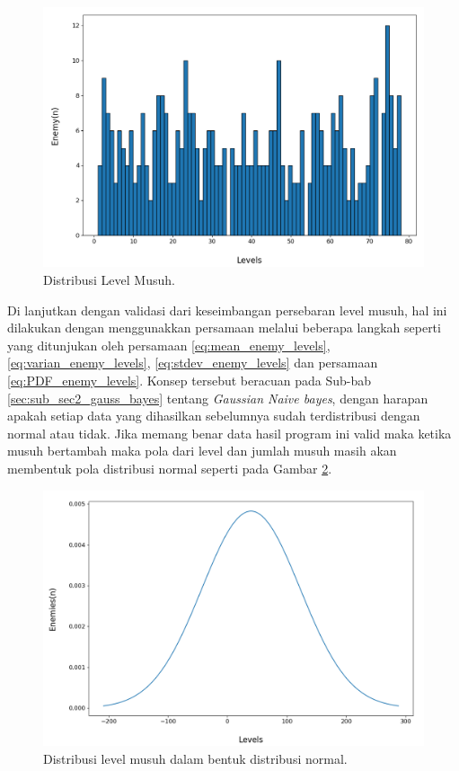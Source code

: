 \begin{figure} [!h] \centering
	\includegraphics[scale=0.45]{img/EnemyLevelDistrib.png}
	\caption{Distribusi Level Musuh.}
	\label{fig:enemy_level_distrib}
\end{figure}

Di lanjutkan dengan validasi dari keseimbangan persebaran level musuh, hal ini dilakukan dengan menggunakkan persamaan melalui beberapa langkah seperti yang ditunjukan oleh persamaan \ref{eq:mean_enemy_levels}, \ref{eq:varian_enemy_levels}, \ref{eq:stdev_enemy_levels} dan persamaan \ref{eq:PDF_enemy_levels}. Konsep tersebut beracuan pada Sub-bab \ref{sec:sub_sec2_gauss_bayes} tentang \textit{Gaussian Naive bayes}, dengan harapan apakah setiap data yang dihasilkan sebelumnya sudah terdistribusi dengan normal atau tidak. Jika memang benar data hasil program ini valid maka ketika musuh bertambah maka pola dari level dan jumlah musuh masih akan membentuk pola distribusi normal seperti pada Gambar \ref{fig:enemy_level_distrib_ndist}.
\vspace{1ex}

\begin{figure} [!h] \centering
	\includegraphics[scale=0.45]{img/EnemyLevelDistribNdist.png}
	\caption{Distribusi level musuh dalam bentuk distribusi normal.}
	\label{fig:enemy_level_distrib_ndist}
\end{figure}

